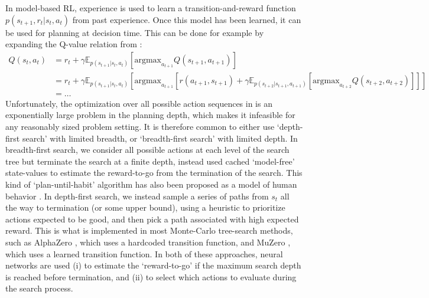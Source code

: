 In model-based RL, experience is used to learn a transition-and-reward function $p(s_{t+1}, r_t | s_t, a_t)$ from past experience.
Once this model has been learned, it can be used for planning at decision time.
This can be done for example by expanding the Q-value relation from :
{\small
\begin{align}
    \label{eq:Q-search}
    Q(s_t,a_t) &=  r_t + \gamma \mathbb{E}_{p(s_{t+1} | s_t, a_t)} \left [ \text{argmax}_{a_{t+1}} Q(s_{t+1}, a_{t+1}) \right ]\\
    &= r_t + \gamma \mathbb{E}_{p(s_{t+1} | s_t, a_t)} \left [ \text{argmax}_{a_{t+1}}
    \left [ r(a_{t+1}, s_{t+1}) + \gamma \mathbb{E}_{p(s_{t+2} | s_{t+1}, a_{t+1})} \left [ \text{argmax}_{a_{t+2}} Q(s_{t+2}, a_{t+2}) \right ] \right ] \right ] \\
    &= \ldots
\end{align}
} Unfortunately, the optimization over all possible action sequences in  is an exponentially large problem in the planning depth, which makes it infeasible for any reasonably sized problem setting.
It is therefore common to either use `depth-first search' with limited breadth, or `breadth-first search' with limited depth.
In breadth-first search, we consider all possible actions at each level of the search tree but terminate the search at a finite depth, instead used cached `model-free' state-values to estimate the reward-to-go from the termination of the search.
This kind of `plan-until-habit' algorithm has also been proposed as a model of human behavior \citep{keramati2016adaptive}.
In depth-first search, we instead sample a series of paths from $s_t$ all the way to termination (or some upper bound), using a heuristic to prioritize actions expected to be good, and then pick a path associated with high expected reward.
This is what is implemented in most Monte-Carlo tree-search methods, such as AlphaZero \citep{silver2018general}, which uses a hardcoded transition function, and MuZero \citep{schrittwieser2020mastering}, which uses a learned transition function.
In both of these approaches, neural networks are used (i) to estimate the `reward-to-go' if the maximum search depth is reached before termination, and (ii) to select which actions to evaluate during the search process.

